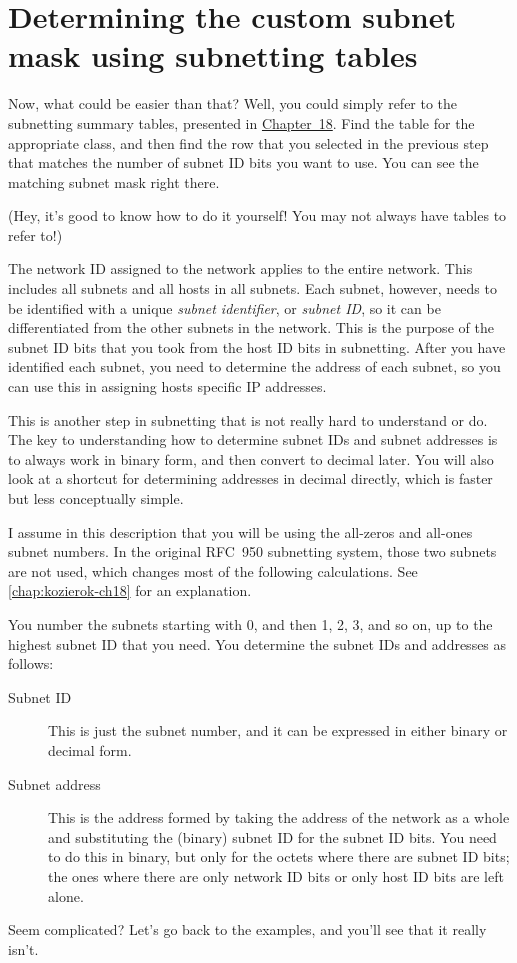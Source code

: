 \section{Determining the custom subnet mask using subnetting tables}

Now, what could be easier than that? Well, you could simply refer to the subnetting summary tables, presented in \protect\hyperlink{ch18.html}{Chapter~18}.
Find the table for the appropriate class, and then find the row that you selected in the previous step that matches the number of subnet ID bits you want to use.
You can see the matching subnet mask right there.

(Hey, it's good to know how to do it yourself! You may not always have tables to refer to!)

 

The network ID assigned to the network applies to the entire network.
This includes all subnets and all hosts in all subnets. Each subnet,
however, needs to be identified with a unique {\emph{subnet
identifier}}, or {\emph{subnet ID}}, so it can be differentiated from
the other subnets in the network. This is the purpose of the subnet ID
bits that you took from the host ID bits in subnetting. After you have
identified each subnet, you need to determine the address of each
subnet, so you can use this in assigning hosts specific IP addresses.

This is another step in subnetting that is not really hard to understand
or do. The key to understanding how to determine subnet IDs and subnet
addresses is to always work in binary form, and then convert to decimal
later. You will also look at a shortcut for determining addresses in
decimal directly, which is faster but less conceptually simple.

\begin{note}
I assume in this description that you will be using the all-zeros and all-ones subnet numbers.
In the original RFC~950 subnetting system, those two subnets are not used, which changes most of the following calculations.
See \cref{chap:kozierok-ch18} for an explanation.
\end{note}


You number the subnets starting with 0, and then 1, 2, 3, and so on, up to the highest subnet ID that you need.
You determine the subnet IDs and addresses as follows:
\begin{description}
   \item[Subnet ID]
      This is just the subnet number, and it can be expressed in either binary or decimal form.
   \item[Subnet address]
      This is the address formed by taking the address of the network as a whole and substituting the (binary) subnet ID for the subnet ID bits.
      You need to do this in binary, but only for the octets where there are subnet ID bits;
      the ones where there are only network ID bits or only host ID bits are left alone.
\end{description}
Seem complicated? Let's go back to the examples, and you'll see that it really isn't.


